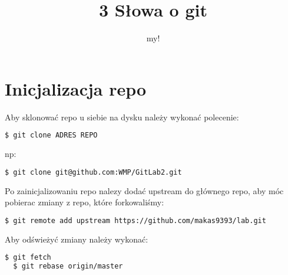 \documentclass[12pt,a4paper]{report}
\author{my!}
\title{3 Słowa o git}
\begin{document}
\maketitle

\chapter{Inicjalizacja repo}
Aby sklonować repo u siebie na dysku należy wykonać polecenie:
\begin{lstlisting}[language=bash]
  $ git clone ADRES REPO
\end{lstlisting}
np:
\begin{lstlisting}[language=bash]
  $ git clone git@github.com:WMP/GitLab2.git
\end{lstlisting}


Po zainicjalizowaniu repo nalezy dodać upstream do głównego repo, aby móc pobierac zmiany z repo, które forkowaliśmy:
\begin{lstlisting}[language=bash]
  $ git remote add upstream https://github.com/makas9393/lab.git
\end{lstlisting}

Aby odświeżyć zmiany należy wykonać:
\begin{lstlisting}[language=bash]
  $ git fetch
  $ git rebase origin/master
\end{lstlisting}
\end{document}
